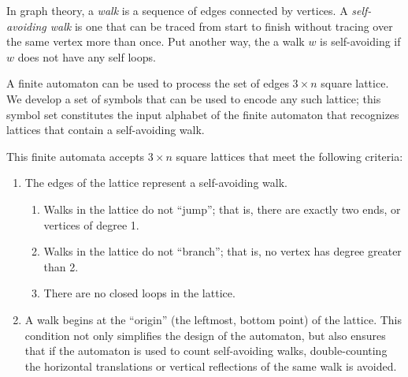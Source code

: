 \label{sec:statement}

In graph theory, a \emph{walk} is a sequence of edges connected by vertices. A \emph{self-avoiding walk} is one that can be traced from start to finish without tracing over the same vertex more than once. Put another way, the a walk $w$ is self-avoiding if $w$ does not have any self loops.

A finite automaton can be used to process the set of edges $3\times n$ square lattice. We develop a set of symbols that can be used to encode any such lattice; this symbol set constitutes the input alphabet of the finite automaton that recognizes lattices that contain a self-avoiding walk.

This finite automata accepts $3\times n$ square lattices that meet the following criteria:
\begin{enumerate}
\item The edges of the lattice represent a self-avoiding walk.
\begin{enumerate}
\item Walks in the lattice do not ``jump''; that is, there are exactly two ends, or vertices of degree 1.
\item Walks in the lattice do not ``branch''; that is, no vertex has degree greater than 2.
\item There are no closed loops in the lattice.
\end{enumerate}
\item A walk begins at the ``origin'' (the leftmost, bottom point) of the lattice. This condition not only simplifies the design of the automaton, but also ensures that if the automaton is used to count self-avoiding walks, double-counting the horizontal translations or vertical reflections of the same walk is avoided.
\end{enumerate}
